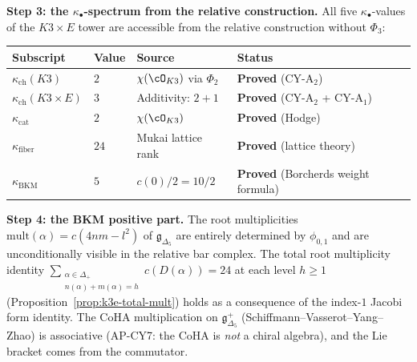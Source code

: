 \medskip
\noindent\textbf{Step 3: the $\kappa_\bullet$-spectrum from the relative construction.}
All five $\kappa_\bullet$-values of the $K3 \times E$ tower are accessible from
the relative construction without $\Phi_3$:

\begin{center}
\renewcommand{\arraystretch}{1.3}
\begin{tabular}{lllll}
 \toprule
 \textbf{Subscript} & \textbf{Value} & \textbf{Source} & \textbf{Status} \\
 \midrule
 $\kappa_{\mathrm{ch}}(K3)$ & $2$ & $\chi(\cO_{K3})$ via $\Phi_2$ & \textbf{Proved} (CY-A$_2$) \\
 $\kappa_{\mathrm{ch}}(K3 \times E)$ & $3$ & Additivity: $2 + 1$ & \textbf{Proved} (CY-A$_2$ + CY-A$_1$) \\
 $\kappa_{\mathrm{cat}}$ & $2$ & $\chi(\cO_{K3})$ & \textbf{Proved} (Hodge) \\
 $\kappa_{\mathrm{fiber}}$ & $24$ & Mukai lattice rank & \textbf{Proved} (lattice theory) \\
 $\kappa_{\mathrm{BKM}}$ & $5$ & $c(0)/2 = 10/2$ & \textbf{Proved} (Borcherds weight formula) \\
 \bottomrule
\end{tabular}
\end{center}

\medskip
\noindent\textbf{Step 4: the BKM positive part.}
The root multiplicities $\mathrm{mult}(\alpha) = c(4nm - l^2)$ of
$\mathfrak{g}_{\Delta_5}$ are entirely determined by $\phi_{0,1}$ and
are unconditionally visible in the relative bar complex.  The total
root multiplicity identity
$\sum_{\substack{\alpha \in \Delta_+ \\ n(\alpha) + m(\alpha) = h}} c(D(\alpha)) = 24$
at each level $h \geq 1$ (Proposition~\ref{prop:k3e-total-mult})
holds as a consequence of the index-$1$ Jacobi form identity.
The CoHA multiplication on $\mathfrak{g}_{\Delta_5}^+$
(Schiffmann--Vasserot--Yang--Zhao) is associative (AP-CY7: the CoHA
is \emph{not} a chiral algebra), and the Lie bracket comes from the
commutator.

